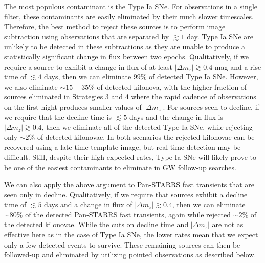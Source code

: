 \clearpage
The most populous contaminant is the Type Ia SNe. For observations in a single filter, these contaminants are easily eliminated by their much slower timescales. Therefore, the best method to reject these sources is to perform image subtraction using observations that are separated by $\gtrsim1$ day. Type Ia SNe are unlikely to be detected in these subtractions as they are unable to produce a statistically significant change in flux between two epochs. Qualitatively, if we require a source to exhibit a change in flux of at least $|\Delta m_z| \gtrsim 0.4$ mag and a rise time of $\lesssim 4$ days, then we can eliminate $99\%$ of detected Type Ia SNe. However, we also eliminate $\sim15-35\%$ of detected kilonova, with the higher fraction of sources eliminated in Strategies 3 and 4 where the rapid cadence of observations on the first night produces smaller values of $|\Delta m_z|$. For sources seen to decline, if we require that the decline time is $\lesssim 5$ days and the change in flux is $|\Delta m_z| \gtrsim 0.4$, then we eliminate all of the detected Type Ia SNe, while rejecting only $\sim2\%$ of detected kilonovae. In both scenarios the rejected kilonovae can be recovered using a late-time template image, but real time detection may be difficult. Still, despite their high expected rates, Type Ia SNe will likely prove to be one of the easiest contaminants to eliminate in GW follow-up searches.

We can also apply the above argument to Pan-STARRS fast transients that are seen only in decline. Qualitatively, if we require that sources exhibit a decline time of $\lesssim 5$ days and a change in flux of $|\Delta m_z| \gtrsim 0.4$, then we can eliminate $\sim80\%$ of the detected Pan-STARRS fast transients, again while rejected $\sim2\%$ of the detected kilonovae. While the cuts on decline time and $|\Delta m_z|$ are not as effective here as in the case of Type Ia SNe, the lower rates mean that we expect only a few detected events to survive. These remaining sources can then be followed-up and eliminated by utilizing pointed observations as described below.

